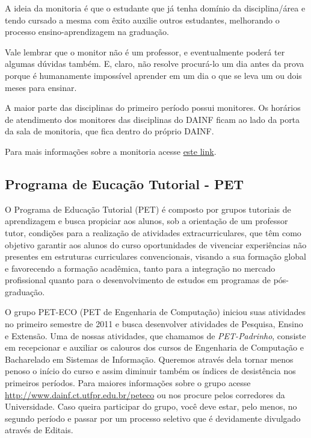 \documentclass[a4paper,12pt,openany]{article}
\begin{document}
A ideia da monitoria é que o estudante que já tenha domínio da disciplina/área e tendo cursado a mesma com êxito auxilie outros estudantes, melhorando o processo ensino-aprendizagem na graduação. 

Vale lembrar que o monitor não é um professor, e eventualmente poderá ter algumas dúvidas também. E, claro, não resolve procurá-lo um dia antes da prova porque é humanamente impossível aprender em um dia o que se leva um ou dois meses para ensinar.

A maior parte das disciplinas do primeiro período possui monitores. Os horários de atendimento dos monitores das disciplinas do DAINF ficam ao lado da porta da sala de monitoria, que fica dentro do próprio DAINF.

Para mais informações sobre a monitoria acesse \href{http://www.utfpr.edu.br/estrutura-universitaria/pro-reitorias/prograd/programas-academicos/programa-de-monitoria}{este link}.






\subsection{Programa de Eucação Tutorial - PET}

O Programa de Educação Tutorial (PET) é composto por grupos tutoriais de aprendizagem e busca propiciar aos alunos, sob a orientação de um professor tutor, condições para a realização de atividades extracurriculares, que têm como objetivo garantir aos alunos do curso oportunidades de vivenciar experiências não presentes em estruturas curriculares convencionais, visando a sua formação global e favorecendo a formação acadêmica, tanto para a integração no mercado profissional quanto para o desenvolvimento de estudos em programas de pós-graduação.

O grupo PET-ECO (PET de Engenharia de Computação) iniciou suas atividades no primeiro semestre de 2011 e busca desenvolver atividades de Pesquisa, Ensino e Extensão. Uma de nossas atividades, que chamamos de \textit{PET-Padrinho}, consiste em recepcionar e auxiliar os calouros dos cursos de Engenharia de Computação e Bacharelado em Sistemas de Informação. Queremos através dela tornar menos penoso o início do curso e assim diminuir também os índices de desistência nos primeiros períodos. Para maiores informações sobre o grupo acesse \href{http://www.dainf.ct.utfpr.edu.br/peteco}{http://www.dainf.ct.utfpr.edu.br/peteco} ou nos procure pelos corredores da Universidade. Caso queira participar do grupo, você deve estar, pelo menos, no segundo período e passar por um processo seletivo que é devidamente divulgado através de Editais.
\end{document}
